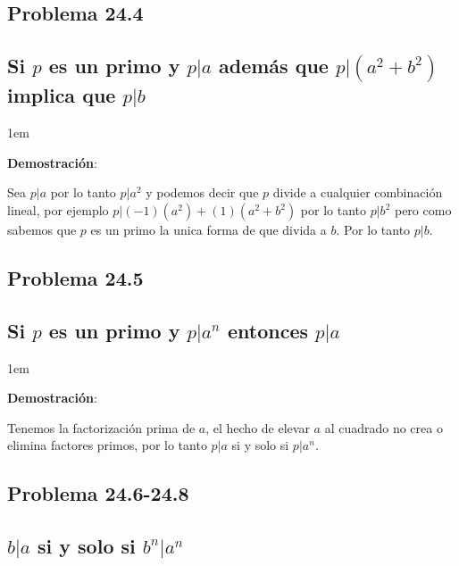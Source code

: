 \documentclass[12pt, fleqn]{article}                             %
\newenvironment{SmallIndentation}[1][0.75em]                    %
    {\begin{adjustwidth}{#1}{}\begin{footnotesize}}                 %
    {\end{footnotesize}\end{adjustwidth}}                           %
\begin{document}
    \clearpage
    \subsection{Problema 24.4}
    \subsection*{Si $p$ es un primo y $p|a$ además que $p|(a^2+b^2)$
        implica que $p|b$}

    \begin{SmallIndentation}[1em]
        \textbf{Demostración}:
        
        Sea $p|a$ por lo tanto $p|a^2$ y podemos decir que $p$ divide
        a cualquier combinación lineal, por ejemplo $p|(-1)(a^2)+(1)(a^2+b^2)$
        por lo tanto $p|b^2$ pero como sabemos que $p$ es un primo la unica
        forma de que divida a $b$. Por lo tanto $p|b$.

    \end{SmallIndentation}


    \subsection{Problema 24.5}
    \subsection*{Si $p$ es un primo y $p|a^n$ entonces $p|a$}

    \begin{SmallIndentation}[1em]
        \textbf{Demostración}:
        
        Tenemos la factorización prima de $a$, el hecho de elevar
        $a$ al cuadrado no crea o elimina factores primos, por lo tanto
        $p|a$ si y solo si $p|a^n$.

    \end{SmallIndentation}


    \clearpage
    \subsection{Problema 24.6-24.8}
    \subsection*{$b|a$ si y solo si $b^n|a^n$}
\end{document}
